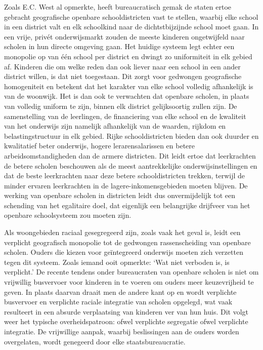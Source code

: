 \documentclass[
  a5paper,
  smalldemyvopaper,10pt,twoside,onecolumn,openright,extrafontsizes,hidelinks]{memoir}
\begin{document}
Zoals E.C. West al opmerkte, heeft bureaucratisch gemak de staten ertoe
gebracht geografische openbare schooldistricten vast te stellen, waarbij
elke school in een district valt en elk schoolkind naar de
dichtstbijzijnde school moet gaan. In een vrije, privét onderwijsmarkt
zouden de meeste kinderen ongetwijfeld naar scholen in hun directe
omgeving gaan. Het huidige systeem legt echter een monopolie op van één
school per district en dwingt zo uniformiteit in elk gebied af. Kinderen
die om welke reden dan ook liever naar een school in een ander district
willen, is dat niet toegestaan. Dit zorgt voor gedwongen geografische
homogeniteit en betekent dat het karakter van elke school volledig
afhankelijk is van de woonwijk. Het is dan ook te verwachten dat
openbare scholen, in plaats van volledig uniform te zijn, binnen elk
district gelijksoortig zullen zijn. De samenstelling van de leerlingen,
de financiering van elke school en de kwaliteit van het onderwijs zijn
namelijk afhankelijk van de waarden, rijkdom en belastingstructuur in
elk gebied. Rijke schooldistricten bieden dan ook duurder en kwalitatief
beter onderwijs, hogere lerarensalarissen en betere
arbeidsomstandigheden dan de armere districten. Dit leidt ertoe dat
leerkrachten de betere scholen beschouwen als de meest aantrekkelijke
onderwijsinstellingen en dat de beste leerkrachten naar deze betere
schooldistricten trekken, terwijl de minder ervaren leerkrachten in de
lagere-inkomensgebieden moeten blijven. De werking van openbare scholen
in districten leidt dus onvermijdelijk tot een schending van het
egalitaire doel, dat eigenlijk een belangrijke drijfveer van het
openbare schoolsysteem zou moeten zijn.

Als woongebieden raciaal gesegregeerd zijn, zoals vaak het geval is,
leidt een verplicht geografisch monopolie tot de gedwongen
rassenscheiding van openbare scholen. Ouders die kiezen voor
geïntegreerd onderwijs moeten zich verzetten tegen dit systeem. Zoals
iemand ooit opmerkte: `Wat niet verboden is, is verplicht.' De recente
tendens onder bureaucraten van openbare scholen is niet om vrijwillig
busvervoer voor kinderen in te voeren om ouders meer keuzevrijheid te
geven. In plaats daarvan draait men de andere kant op en wordt
verplichte busvervoer en verplichte raciale integratie van scholen
opgelegd, wat vaak resulteert in een absurde verplaatsing van kinderen
ver van hun huis. Dit volgt weer het typische overheidspatroon: ofwel
verplichte segregatie ofwel verplichte integratie. De vrijwillige
aanpak, waarbij beslissingen aan de ouders worden overgelaten, wordt
genegeerd door elke staatsbureaucratie.
\end{document}
